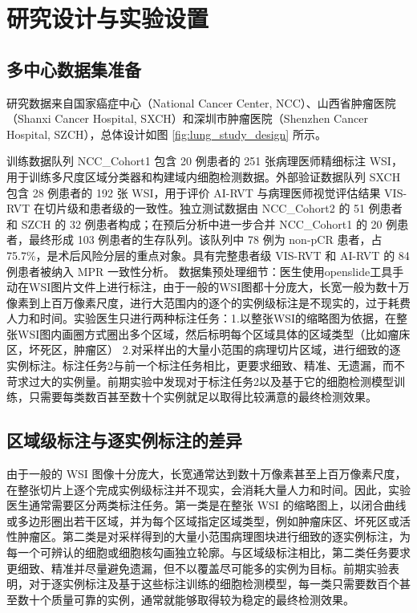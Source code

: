 \section{研究设计与实验设置}
\subsection{多中心数据集准备}
研究数据来自国家癌症中心（National Cancer Center, NCC）、山西省肿瘤医院（Shanxi Cancer Hospital, SXCH）和深圳市肿瘤医院（Shenzhen Cancer Hospital, SZCH），总体设计如图 \ref{fig:lung_study_design} 所示。

训练数据队列 NCC\_Cohort1 包含 20 例患者的 251 张病理医师精细标注 WSI，用于训练多尺度区域分类器和构建域内细胞检测数据。外部验证数据队列 SXCH 包含 28 例患者的 192 张 WSI，用于评价 AI-RVT 与病理医师视觉评估结果 VIS-RVT 在切片级和患者级的一致性。独立测试数据由 NCC\_Cohort2 的 51 例患者和 SZCH 的 32 例患者构成；在预后分析中进一步合并 NCC\_Cohort1 的 20 例患者，最终形成 103 例患者的生存队列。该队列中 78 例为 non-pCR 患者，占 75.7\%，是术后风险分层的重点对象。具有完整患者级 VIS-RVT 和 AI-RVT 的 84 例患者被纳入 MPR 一致性分析。
数据集预处理细节：医生使用openslide工具手动在WSI图片文件上进行标注，由于一般的WSI图都十分庞大，长宽一般为数十万像素到上百万像素尺度，进行大范围内的逐个的实例级标注是不现实的，过于耗费人力和时间。实验医生只进行两种标注任务：1.以整张WSI的缩略图为依据，在整张WSI图内画圈方式圈出多个区域，然后标明每个区域具体的区域类型（比如瘤床区，坏死区，肿瘤区） 2.对采样出的大量小范围的病理切片区域，进行细致的逐实例标注。标注任务2与前一个标注任务相比，更要求细致、精准、无遗漏，而不苛求过大的实例量。前期实验中发现对于标注任务2以及基于它的细胞检测模型训练，只需要每类数百甚至数十个实例就足以取得比较满意的最终检测效果。

\subsection{区域级标注与逐实例标注的差异}
由于一般的 WSI 图像十分庞大，长宽通常达到数十万像素甚至上百万像素尺度，在整张切片上逐个完成实例级标注并不现实，会消耗大量人力和时间。因此，实验医生通常需要区分两类标注任务。第一类是在整张 WSI 的缩略图上，以闭合曲线或多边形圈出若干区域，并为每个区域指定区域类型，例如肿瘤床区、坏死区或活性肿瘤区。第二类是对采样得到的大量小范围病理图块进行细致的逐实例标注，为每一个可辨认的细胞或细胞核勾画独立轮廓。与区域级标注相比，第二类任务要求更细致、精准并尽量避免遗漏，但不以覆盖尽可能多的实例为目标。前期实验表明，对于逐实例标注及基于这些标注训练的细胞检测模型，每一类只需要数百个甚至数十个质量可靠的实例，通常就能够取得较为稳定的最终检测效果。

